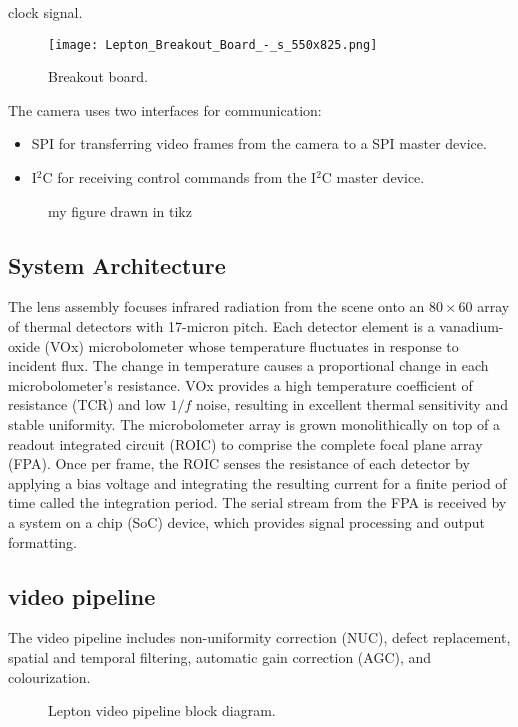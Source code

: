 clock signal.\cite{breakoutboard}
%
\begin{figure}[!htb]
    \centering
    \texttt{[image: Lepton\_Breakout\_Board\_-\_s\_550x825.png]}
    \caption{Breakout board.}
    \label{fig:breakoutboard}
 \end{figure}
\linebreak The camera uses two interfaces for communication:
\begin{itemize}
    \item SPI for transferring video frames from the camera to a SPI master
device.
    \item I$^{2}$C for receiving control commands from the I$^{2}$C master
device.
\end{itemize}
%
\begin{figure}[htb]
    \centering
    \resizebox{0.8\textwidth}{!}{}
    \caption{my figure drawn in tikz}
    \label{fig:myfigure}
\end{figure}
%
\subsection{System Architecture}
\label{ssec:leptonarchitecture}
The lens assembly focuses infrared radiation from the scene onto an $80 \times 60$ array
of thermal detectors with 17-micron pitch. Each detector element is a
vanadium-oxide (VOx) microbolometer whose temperature fluctuates in response to
incident flux. The change in temperature causes a proportional change in each
microbolometer’s resistance. VOx provides a high temperature coefficient of
resistance (TCR) and low $1/f$ noise, resulting in excellent thermal sensitivity
and stable uniformity. The microbolometer array is grown monolithically on top
of a readout integrated circuit (ROIC) to comprise the complete focal plane
array (FPA). Once per frame, the ROIC senses the resistance of each detector by
applying a bias voltage and integrating the resulting current for a finite
period of time called the integration period. The serial stream from the FPA is
received by a system on a chip (SoC) device, which provides signal processing
and output formatting.
%
\subsection{video pipeline}
\label{ssec:pipeline}
The video pipeline includes non-uniformity correction (NUC), defect replacement,
spatial and temporal filtering, automatic gain correction (AGC), and
colourization.
%
\begin{figure}[!h]
    \centering
    \resizebox{0.65\textwidth}{!}{}
    \caption{Lepton video pipeline block diagram.}
    \label{fig:videopipe}
\end{figure}
